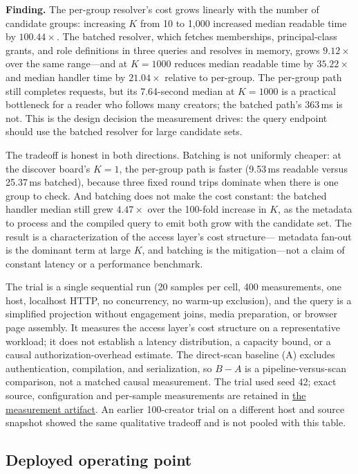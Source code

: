 \documentclass[sigconf, nonacm]{acmart}
\newcommand{\artifactbase}{https://github.com/jacoby149/web10}
\newcommand{\domainartifactrev}{26720acba859c7eb03fc5d26a6221cdde5b764a1}
\newcommand{\domainartifactdir}[2]{\href{\artifactbase/tree/\domainartifactrev/#1}{#2}}
\begin{document}
\textbf{Finding.} The per-group resolver's cost grows linearly with the number
of candidate groups: increasing $K$ from 10 to 1,000 increased median readable
time by $100.44\times$. The batched resolver, which fetches memberships,
principal-class grants, and role definitions in three queries and resolves in
memory, grows $9.12\times$ over the same range---and at $K=1000$ reduces median
readable time by $35.22\times$ and median handler time by $21.04\times$ relative
to per-group. The per-group path still completes requests, but its 7.64-second
median at $K=1000$ is a practical bottleneck for a reader who follows many
creators; the batched path's 363\,ms is not. This is the design decision the
measurement drives: the query endpoint should use the batched resolver for
large candidate sets.

The tradeoff is honest in both directions. Batching is not uniformly cheaper:
at the discover board's $K=1$, the per-group path is faster (9.53\,ms readable
versus 25.37\,ms batched), because three fixed round trips dominate when there
is one group to check. And batching does not make the cost constant: the batched
handler median still grew $4.47\times$ over the 100-fold increase in $K$, as the
metadata to process and the compiled query to emit both grow with the candidate
set. The result is a characterization of the access layer's cost structure---
metadata fan-out is the dominant term at large $K$, and batching is the
mitigation---not a claim of constant latency or a performance benchmark.

The trial is a single sequential run (20 samples per cell, 400 measurements,
one host, localhost HTTP, no concurrency, no warm-up exclusion), and the query
is a simplified projection without engagement joins, media preparation, or
browser page assembly. It measures the access layer's cost structure on a
representative workload; it does not establish a latency distribution, a
capacity bound, or a causal authorization-overhead estimate. The direct-scan
baseline (A) excludes authentication, compilation, and serialization, so
$B - A$ is a pipeline-versus-scan comparison, not a matched causal measurement.
The trial used seed 42; exact source, configuration and per-sample measurements
are retained in \domainartifactdir{research/experiments/costfn}{the measurement artifact}.
An earlier 100-creator trial on a different host and source snapshot showed the
same qualitative tradeoff and is not pooled with this table.

\subsection{Deployed operating point}
\end{document}
